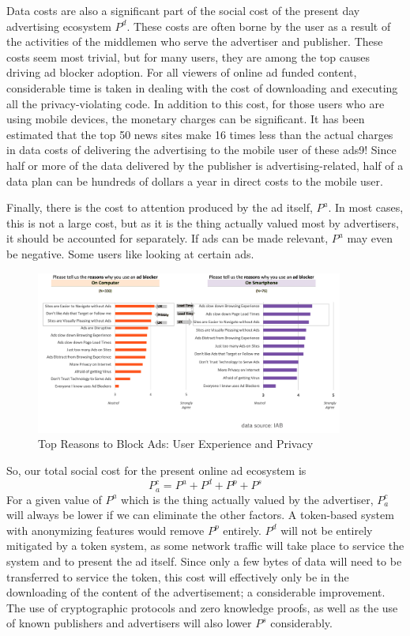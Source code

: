 \documentclass[11pt]{article}
\begin{document}
Data costs are also a significant part of the social cost of the
present day advertising ecosystem  $P^{d}$. These costs are often borne by the
user as a result of the activities of the middlemen who serve the
advertiser and publisher. These costs seem most trivial, but for many
users, they are among the top causes driving ad blocker adoption. For
all viewers of online ad funded content, considerable time is taken in
dealing with the cost of downloading and executing all the
privacy-violating code. In addition to this cost, for those users who
are using mobile devices, the monetary charges can be significant. It
has been estimated that the top 50 news sites make 16 times less than
the actual charges in data costs of delivering the advertising to the
mobile user of these ads9! Since half or more of the data delivered
by the publisher is advertising-related, half of a data plan can be
hundreds of dollars a year in direct costs to the mobile user. 

Finally, there is the cost to attention produced by the ad itself,
$P^{a}$. In most cases, this is not a large cost, but as it is the thing
actually valued most by advertisers, it should be accounted for
separately. If ads can be made relevant, $P^{a}$ may even be negative. Some
users like looking at certain ads.



\begin{figure}
\begin{center}
\includegraphics[width=0.9\textwidth]{topreasons_to_block.png}
\caption{Top Reasons to Block Ads: User Experience and Privacy }
\end{center}
\end{figure}





So, our total social cost for the present online ad ecosystem is 
 \[P^{c}_a = P^{a} + P^{d} + P^{p} + P^{s}\]
 For a given value of $P^{a}$ which is the thing actually valued by the
 advertiser, $P^{c}_a $ will always be lower if we can eliminate the other
 factors. A token-based system with anonymizing features would remove $P^{p}$
 entirely. $P^{d}$ will not be entirely mitigated by a token system, as some
 network traffic will take place to service the system and to present
 the ad itself. Since only a few bytes of data will need to be
 transferred to service the token, this cost will effectively only be
 in the downloading of the content of the advertisement; a
 considerable improvement. The use of cryptographic protocols and zero
 knowledge proofs, as well as the use of known publishers and
 advertisers will also lower $P^{s}$ considerably.
\end{document}
